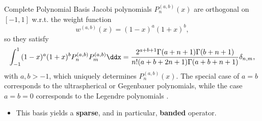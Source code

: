 \documentclass[aspectratio=169, hyperref={colorlinks=true}]{beamer}
\begin{document}
  \begin{frame}{Complete Polynomial Basis}
    Jacobi polynomials $P_n^{(a,b)}(x)$ are orthogonal on $[-1,1]$ w.r.t. the weight function
    \begin{equation*}
      w^{(a,b)}(x)=(1-x)^a (1+x)^b,
    \end{equation*}
    so they satisfy
    \begin{align*}\label{eq:orthogonalityconditionJacobi}
      \int_{-1}^1(1-x)^a(1+x)^bP_n^{(a,b)}P_m^{(a,b)}\ddx = \frac{2^{a+b+1} \Gamma (a+n+1) \Gamma (b+n+1)}{n! (a+b+2 n+1) \Gamma (a+b+n+1)} \delta _{n,m},
    \end{align*}
    with $a	,b>-1$, which uniquely determines $P_n^{(a,b)}(x)$. The special case of $a=b$ corresponds to the ultraspherical or Gegenbauer polynomials, while the case $a=b=0$ corresponds to the Legendre polynomials \cite[Table 18.3.1]{2018-nist}.

    \begin{itemize}
      \item This basis yields a \textbf{sparse}, and in particular, \textbf{banded} operator.
    \end{itemize}
  \end{frame}
\end{document}
